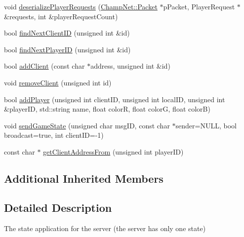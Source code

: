 \begin{DoxyCompactItemize}
void \hyperlink{class_state_server_a1d5bf4d1f14be55beab88feb0a8b5336}{deserialize\-Player\-Requests} (\hyperlink{class_champ_net_1_1_packet}{Champ\-Net\-::\-Packet} $\ast$p\-Packet, Player\-Request $\ast$\&requests, int \&player\-Request\-Count)
\item 
bool \hyperlink{class_state_server_afcde4aa297197e9f2840d24612501b5a}{find\-Next\-Client\-I\-D} (unsigned int \&id)
\item 
bool \hyperlink{class_state_server_a23120a56bdaa4d5e9d555b05e6ba1e8e}{find\-Next\-Player\-I\-D} (unsigned int \&id)
\item 
bool \hyperlink{class_state_server_a4f6675bef8d34e3e3ffbe3e71e16732e}{add\-Client} (const char $\ast$address, unsigned int \&id)
\item 
void \hyperlink{class_state_server_aa1feeeb495d9bf60f5750323e839c02d}{remove\-Client} (unsigned int id)
\item 
bool \hyperlink{class_state_server_a204e3b252a6b6f50015b598e9beb1b09}{add\-Player} (unsigned int client\-I\-D, unsigned int local\-I\-D, unsigned int \&player\-I\-D, std\-::string name, float color\-R, float color\-G, float color\-B)
\item 
void \hyperlink{class_state_server_a7d80660aa2ef7ab52ce8c86752abf145}{send\-Game\-State} (unsigned char msg\-I\-D, const char $\ast$sender=N\-U\-L\-L, bool broadcast=true, int client\-I\-D=-\/1)
\item 
const char $\ast$ \hyperlink{class_state_server_a2220d5a02b2c16cd67499fa38342bcad}{get\-Client\-Address\-From} (unsigned int player\-I\-D)
\end{DoxyCompactItemize}
\subsection*{Additional Inherited Members}


\subsection{Detailed Description}
The state application for the server (the server has only one state) 

